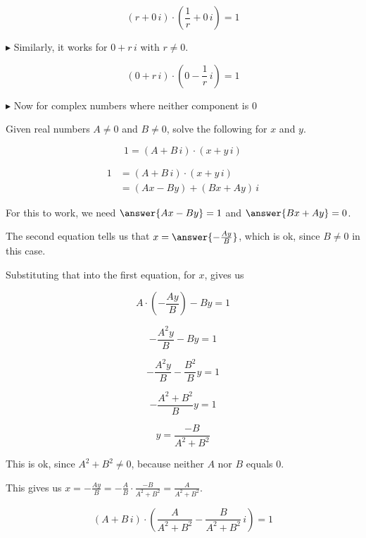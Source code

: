 \documentclass{ximera}
\begin{document}
\[   (r + 0 \, i) \cdot \left(\frac{1}{r} + 0 \, i \right) = 1        \]







$\blacktriangleright$  Similarly, it works for $0 + r \, i$ with $r \ne 0$.


\[   (0 + r \, i) \cdot \left(0 - \frac{1}{r} \, i \right) = 1        \]





$\blacktriangleright$ Now for complex numbers where neither component is $0$


\begin{explanation}


Given real numbers $A \ne 0$ and $B \ne 0$, solve the following for $x$ and $y$.


\[       1 = (A + B \, i) \cdot (x + y \, i)            \]



\begin{align*}
1          & = (A + B \, i) \cdot (x + y \, i)      \\
           & = (Ax-By) + (Bx+Ay) \, i
\end{align*}


For this to work, we need $\answer{A x - B y} = 1$ and $\answer{B x + A y} = 0$.



The second equation tells us that $x = \answer{-\frac{A y}{B}}$, which is ok, since $B \ne 0$ in this case.

Substituting that into the first equation, for $x$, gives us


\[   A \cdot \left(-\frac{A y}{B}\right) - B y = 1     \]


\[   -\frac{A^2 y}{B} - B y = 1     \]

\[   -\frac{A^2 y}{B} - \frac{B^2}{B} y = 1     \]


\[   -\frac{A^2 + B^2}{B} y = 1     \]


\[  y = \frac{-B}{A^2 + B^2}     \]

This is ok, since $A^2 + B^2 \ne 0$, because neither $A$ nor $B$ equals $0$.



This gives us $x = -\frac{A y}{B} = -\frac{A}{B} \cdot \frac{-B}{A^2 + B^2} = \frac{A}{A^2 + B^2} $.







\[       (A + B \, i) \cdot \left( \frac{A}{A^2 + B^2} - \frac{B}{A^2 + B^2} \, i \right) = 1            \]



\end{explanation}
\end{document}
